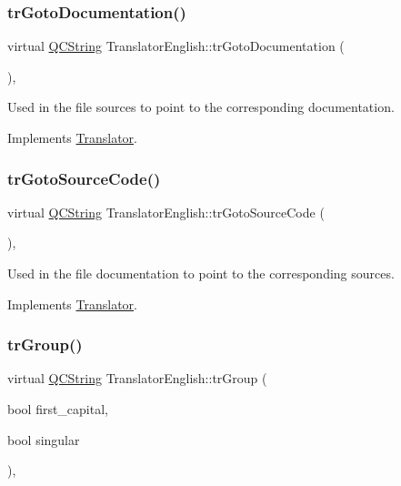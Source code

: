 \subsubsection{\texorpdfstring{trGotoDocumentation()}{trGotoDocumentation()}}
{\footnotesize\ttfamily virtual \mbox{\hyperlink{class_q_c_string}{Q\+C\+String}} Translator\+English\+::tr\+Goto\+Documentation (\begin{DoxyParamCaption}{ }\end{DoxyParamCaption})\hspace{0.3cm}{\ttfamily [inline]}, {\ttfamily [virtual]}}

Used in the file sources to point to the corresponding documentation. 

Implements \mbox{\hyperlink{class_translator}{Translator}}.

\mbox{\label{class_translator_english_afd18b8af167cffc0459ebcce9c8ab419}} 
\subsubsection{\texorpdfstring{trGotoSourceCode()}{trGotoSourceCode()}}
{\footnotesize\ttfamily virtual \mbox{\hyperlink{class_q_c_string}{Q\+C\+String}} Translator\+English\+::tr\+Goto\+Source\+Code (\begin{DoxyParamCaption}{ }\end{DoxyParamCaption})\hspace{0.3cm}{\ttfamily [inline]}, {\ttfamily [virtual]}}

Used in the file documentation to point to the corresponding sources. 

Implements \mbox{\hyperlink{class_translator}{Translator}}.

\mbox{\label{class_translator_english_a19e531287c10b454bf6408aeabeb35a5}} 
\subsubsection{\texorpdfstring{trGroup()}{trGroup()}}
{\footnotesize\ttfamily virtual \mbox{\hyperlink{class_q_c_string}{Q\+C\+String}} Translator\+English\+::tr\+Group (\begin{DoxyParamCaption}\item[{bool}]{first\+\_\+capital,  }\item[{bool}]{singular }\end{DoxyParamCaption})\hspace{0.3cm}{\ttfamily [inline]}, {\ttfamily [virtual]}}

